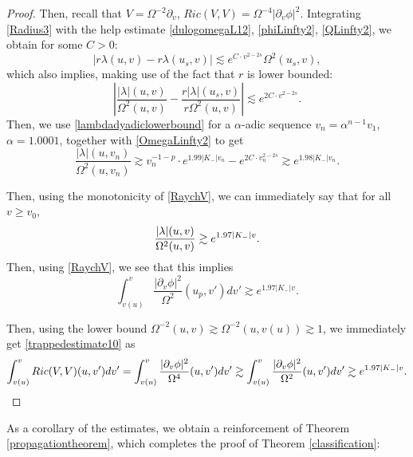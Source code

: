 \documentclass[10pt,a4paper]{article}
\theoremstyle{plain}
\theoremstyle{remark}
\theoremstyle{definition}
\theoremstyle{plain}
\theoremstyle{remark}
\theoremstyle{definition}
\numberwithin{equation}{section}
\begin{document}
\begin{proof}
Then, recall that $V = \Omega^{-2} \partial_v$, $Ric(V,V) = \Omega^{-4} |\partial_v \phi|^2$. Integrating \eqref{Radius3} with the help estimate \eqref{dulogomegaL12}, \eqref{phiLinfty2}, \eqref{QLinfty2}, we obtain for some $C>0$: $$ |r\lambda(u,v)-r\lambda(u_s,v)| \lesssim e^{ C \cdot v^{2-2s}}  \Omega^2(u_s,v),$$ which also implies, making use of the fact that $r$ is lower bounded: $$| \frac{|\lambda|(u,v)}{\Omega^2(u,v)}- \frac{r|\lambda|(u_s,v)}{r\Omega^2(u,v)}| \lesssim e^{2C \cdot v^{2-2s}}.$$ Then, we use \eqref{lambdadyadiclowerbound} for a $\alpha$-adic sequence $v_{n}= \alpha^{n-1} v_1$, $\alpha=1.0001$, together with \eqref{OmegaLinfty2} to get  $$ \frac{|\lambda|(u,v_n)}{\Omega^2(u,v_n)}\gtrsim v_n^{-1-p} \cdot e^{1.99 |K_-| v_n} -e^{2C \cdot v_n^{2-2s}} \gtrsim e^{1.98 |K_-| v_n}.$$

Then, using the monotonicity of \eqref{RaychV}, we can immediately say that for all $v\geq v_0$, \begin{equation}
\frac{|\lambda|(u,v)}{\Omega^2(u,v)} \gtrsim e^{1.97\color{black} |K_-| v }.
\end{equation}
Then, using \eqref{RaychV}, we see that this implies $$ \int_{v(u)}^{v} \frac{ |\partial_v \phi|^2}{\Omega^2}(u_p,v')dv' \gtrsim e^{1.97 |K_-| v }.$$

Then, using the lower bound $\Omega^{-2}(u,v) \gtrsim \Omega^{-2}(u,v(u)) \gtrsim 1$, we immediately get \eqref{trappedestimate10} as $$  \int_{v(u)}^{v}Ric(V,V)(u,v')dv' = \int_{v(u)}^{v} \frac{ |\partial_v \phi|^2}{\Omega^4}(u,v')dv' \gtrsim  \int_{v(u)}^{v}\frac{ |\partial_v \phi|^2}{\Omega^2}(u,v')dv' \gtrsim e^{1.97\color{black} |K_-| v }.$$ 





\end{proof}

As a corollary of the estimates, we obtain a reinforcement of Theorem \ref{propagationtheorem}, which completes the proof of Theorem \ref{classification}:
\end{document}

